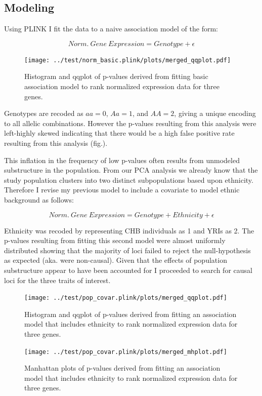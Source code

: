 \documentclass[12pt,a4paper]{article}
\begin{document}
\subsection{Modeling} 
Using PLINK I fit the data to a naive association model of the form:

$$
	Norm.~Gene~Expression = Genotype + \epsilon
$$

\begin{figure}
\texttt{[image: ../test/norm\_basic.plink/plots/merged\_qqplot.pdf]}
\caption{Histogram and qqplot of p-values derived from fitting basic association model to rank normalized expression data for three genes.}
\label{norm_qq}
\end{figure}   


Genotypes are recoded as $aa=0$, $Aa=1$, and $AA=2$, giving a unique encoding to all allelic combinations. However the p-values resulting from this analysis were left-highly skewed indicating that there would be a high false positive rate resulting from this analysis (fig.\label{norm_qq}). 


This inflation in the frequency of low p-values often results from unmodeled substructure in the population. From our PCA analysis we already know that the study population clusters into two distinct subpopulations based upon ethnicity. Therefore I revise my previous model to include a covariate to model ethnic background as follows: 

$$
	Norm.~Gene~Expression = Genotype + Ethnicity +\epsilon
$$

Ethnicity was recoded by representing CHB individuals as 1 and YRIs as 2. The p-values resulting from fitting this second model were almost uniformly distributed showing that the majority of loci failed to reject the null-hypothesis as expected (aka. were non-causal). Given that the effects of population substructure appear to have been accounted for I proceeded to search for causal loci for the three traits of interest. 

\begin{figure}
\texttt{[image: ../test/pop\_covar.plink/plots/merged\_qqplot.pdf]}
\caption{Histogram and qqplot of p-values derived from fitting an association model that includes ethnicity to rank normalized expression data for three genes.}
\label{covar_pp}
\end{figure}

\begin{figure}
\label{fig:merged_mhplot}
\texttt{[image: ../test/pop\_covar.plink/plots/merged\_mhplot.pdf]}
\caption{Manhattan plots of p-values derived from fitting an association model that includes ethnicity to rank normalized expression data for three genes.}
\end{figure}
\end{document}

